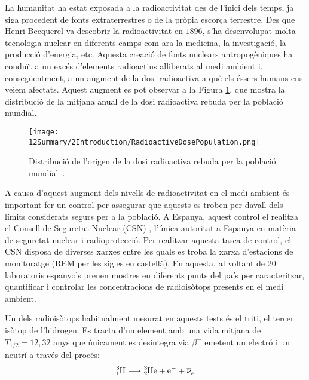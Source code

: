 La humanitat ha estat exposada a la radioactivitat des de l'inici dels temps, ja siga procedent de fonts extraterrestres o de la pròpia escorça terrestre. Des que Henri Becquerel va descobrir la radioactivitat en $1896$, s'ha desenvolupat molta tecnologia nuclear en diferents camps com ara la medicina, la investigació, la producció d'energia, etc. Aquesta creació de fonts nuclears antropogèniques ha conduït a un excés d'elements radioactius alliberats al medi ambient i, consegüentment, a un augment de la dosi radioactiva a què els éssers humans ens veiem afectats. Aquest augment es pot observar a la Figura  \ref{fig:DosiRadioactiva}, que mostra la distribució de la mitjana anual de la dosi radioactiva rebuda per la població mundial.

\begin{figure}[h]
\texttt{[image: 12Summary/2Introduction/RadioactiveDosePopulation.png]}
\centering
\caption{Distribució de l'origen de la dosi radioactiva rebuda per la població mundial~\cite{IAEA}\label{fig:DosiRadioactiva}.}
\end{figure}

A causa d'aquest augment dels nivells de radioactivitat en el medi ambient és important fer un control per assegurar que aquests es troben per davall dels límits considerats segurs per a la població. A Espanya, aquest control el realitza el Consell de Seguretat Nuclear (CSN) \cite{CSN}, l'única autoritat a Espanya en matèria de seguretat nuclear i radioprotecció. Per realitzar aquesta tasca de control, el CSN disposa de diverses xarxes entre les quals es troba la xarxa d'estacions de monitoratge (REM per les sigles en castellà). En aquesta, al voltant de 20 laboratoris espanyols prenen mostres en diferents punts del país per caracteritzar, quantificar i controlar les concentracions de radioisòtops presents en el medi ambient.

Un dels radioisòtops habitualment mesurat en aquests tests és el triti, el tercer isòtop de l'hidrogen. Es tracta d'un element amb una vida mitjana de $T_{1/2} = 12,32$ anys que únicament es desintegra via $\beta^{-}$ emetent un electró i un neutrí a través del procés:
\begin{equation}
\ce{^{3}_{1}H} \longrightarrow \ce{^{3}_{2}He}  + \ce{e^-}  + \ce{\overline{\nu}_e}
\label{eq:DecaimentTriti}
\end{equation}

